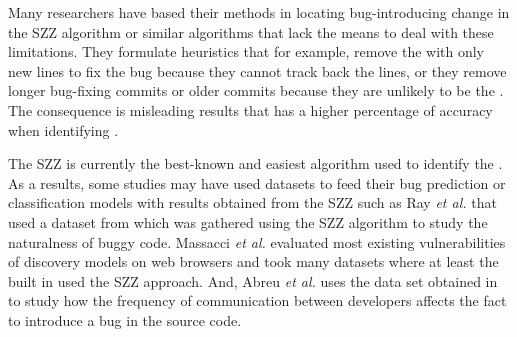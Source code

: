 \documentclass[a4paper, 12pt]{book}
\begin{document}
Many researchers have based their methods in locating bug-introducing change in the SZZ algorithm or similar algorithms that lack the means to deal with these limitations. They formulate heuristics that for example, remove the \BFC with only new lines to fix the bug because they cannot track back the lines, or they remove longer bug-fixing commits or older commits because they are unlikely to be the \BIC. The consequence is misleading results that has a higher percentage of accuracy when identifying \BIC. 

The SZZ is currently the best-known and easiest algorithm used to identify the \BIC. As a results, some studies may have used datasets to feed their bug prediction or classification models with results obtained from the SZZ such as Ray \emph{et al.} that used a dataset from \cite{rahman2014comparing} which was gathered using the SZZ algorithm to study the naturalness of buggy code. Massacci \emph{et al.} evaluated most existing vulnerabilities of discovery models on web browsers and took many datasets where at least the built in \cite{massacci2014empirical} used the SZZ approach. And, Abreu \emph{et al.} uses the data set obtained in \cite{abreu2009practical} to study how the frequency of communication between developers affects the fact to introduce a bug in the source code.

\end{document}
